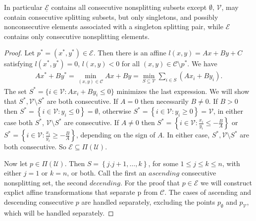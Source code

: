 \documentclass{article}
\theoremstyle{case}
\begin{document}
In particular $\underline{\mathcal{E}}$ contains all consecutive nonsplitting subsets except $\emptyset$, $\mathcal{V}$, may contain consecutive splitting subsets, but only singletons, and possibly nonconsecutive elements associated with a singleton splitting pair, while $\mathcal{E}$ contains only consecutive nonsplitting elements.
\begin{proof}
Let $p ^* = (x^*, y^*) \in \mathcal{E}$. Then there is an affine $l\left(x,y\right) = Ax + By + C$ satisfying $l(x^*, y^*) = 0$, $l(x,y) < 0$ for all $(x,y) \in \mathcal{C} \setminus p^*$.  We have
\begin{align} \label{eq3}
Ax^* + By^* = \min_{(x,y) \in \mathcal{C}} Ax + By = \min_{S \subseteq \mathcal{V}} \sum_{i \in S} (Ax_i + By_i).
\end{align}
The set $S^* = \{ i \in \mathcal{V}: Ax_i + By_i \leq 0 \}$ minimizes the last expression. We will show that $S^*, \mathcal{V}\setminus S^*$ are both consecutive. If $A = 0$ then necessarily $B \neq 0$. If $B > 0$ then $S^* =\left\lbrace i \in \mathcal{V} \colon y_i \leq 0 \right\rbrace = \emptyset$, otherwise $S^* = \left\lbrace i \in \mathcal{V}  \colon y_i \geq 0 \right\rbrace = \mathcal{V}$, in either case both $S^*$, $\mathcal{V}\setminus S^*$ are consecutive. If $ A \neq 0$ then $S^* = \left\lbrace i \in \mathcal{V} \colon \frac{x_i}{y_i} \leq -\frac{B}{A} \right\rbrace$ or $S^* = \left\lbrace i \in \mathcal{V} \colon \frac{x_i}{y_i} \geq -\frac{B}{A} \right\rbrace$, depending on the sign of $A$. In either case, $S^*, \mathcal{V}\setminus S^*$ are both consecutive. So $\mathcal{E} \subseteq \Pi(\mathcal{U})$.

Now let $p \in \Pi\left( \mathcal{U}\right)$. Then $S = \left\lbrace j.j+1, \dots, k \right\rbrace$, for some $1 \leq j \leq k \leq n$, with either $j = 1$ or $k = n$, or both. Call the first an $\textit{ascending}$ consecutive nonsplitting set, the second $\textit{decending}$. For the proof that $p \in \mathcal{E}$ we will construct explict affine transformations that separate p from $\mathcal{C}$. The cases of ascending and descending consecutive $p$ are handled separately, excluding the points $p_{\emptyset}$ and $p_{\mathcal{V}}$, which will be handled separately.


\end{proof}
\end{document}
